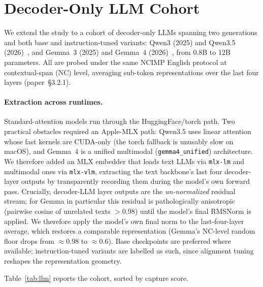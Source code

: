 \documentclass[11pt]{article}
\begin{document}
\section{Decoder-Only LLM Cohort}

We extend the study to a cohort of decoder-only LLMs spanning two generations and both base and
instruction-tuned variants: Qwen3 (2025) and Qwen3.5 (2026)~\cite{qwen3}, and Gemma~3 (2025) and
Gemma~4 (2026)~\cite{gemma3}, from 0.8B to 12B parameters. All are probed under the same NCIMP
English protocol at contextual-span (NC) level, averaging sub-token representations over the last
four layers (paper~\S3.2.1).

\paragraph{Extraction across runtimes.} Standard-attention models run through the HuggingFace/torch
path. Two practical obstacles required an Apple-MLX path: Qwen3.5 uses linear attention whose fast
kernels are CUDA-only (the torch fallback is unusably slow on macOS), and Gemma~4 is a unified
multimodal (\texttt{gemma4\_unified}) architecture. We therefore added an MLX embedder that loads
text LLMs via \texttt{mlx-lm} and multimodal ones via \texttt{mlx-vlm}, extracting the text
backbone's last four decoder-layer outputs by transparently recording them during the model's own
forward pass. Crucially, decoder-LLM layer outputs are the \emph{un-normalized} residual stream;
for Gemma in particular this residual is pathologically anisotropic (pairwise cosine of unrelated
texts $>0.98$) until the model's final RMSNorm is applied. We therefore apply the model's own final
norm to the last-four-layer average, which restores a comparable representation (Gemma's NC-level
random floor drops from $\approx0.98$ to $\approx0.6$). Base checkpoints are preferred where
available; instruction-tuned variants are labelled as such, since alignment tuning reshapes the
representation geometry.

Table~\ref{tab:llm} reports the cohort, sorted by capture score.

\begin{table}[H]
\centering
\small

\caption{Decoder-only LLMs on English NCIMP at contextual-span (NC) level, averaged over
naturalistic and neutral contexts, using the last-four-layer + final-norm recipe. ISC is idiomatic
synonym capture, LOD lexical-overlap dominance, FLOOR the random-similarity floor (anisotropy
proxy), and ICS the composite capture score; the partial-capture threshold is 0.55. Numbers are
generated automatically from the run outputs.}
\label{tab:llm}
\end{table}
\end{document}
